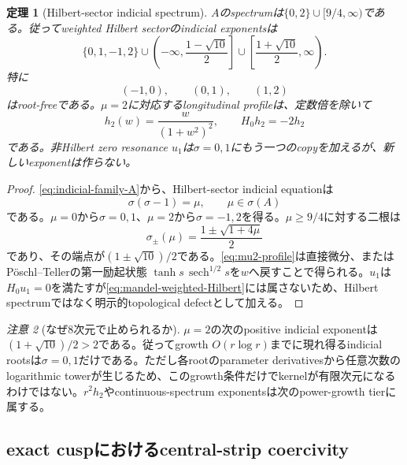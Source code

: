 \documentclass[11pt,a4paper]{ltjsarticle}
\newtheorem{theorem}{定理}[section]
\theoremstyle{definition}
\theoremstyle{remark}
\newtheorem{remark}[theorem]{注意}
\begin{document}
\begin{theorem}[Hilbert-sector indicial spectrum]\label{thm:indicial-spectrum}
$A$のspectrumは$\{0,2\}\cup[9/4,\infty)$である。従ってweighted Hilbert sectorのindicial exponentsは
\begin{equation}\label{eq:indicial-root-set}
 \{0,1,-1,2\}
 \cup
 \left(-\infty,\frac{1-\sqrt{10}}2\right]
 \cup
 \left[\frac{1+\sqrt{10}}2,\infty\right).
\end{equation}
特に
\begin{equation}\label{eq:root-free-strips}
 (-1,0),\qquad(0,1),\qquad(1,2)
\end{equation}
はroot-freeである。$\mu=2$に対応するlongitudinal profileは、定数倍を除いて
\begin{equation}\label{eq:mu2-profile}
 h_2(w)=\frac{w}{(1+w^2)^2},
 \qquad H_0h_2=-2h_2
\end{equation}
である。非Hilbert zero resonance $u_1$は$\sigma=0,1$にもう一つのcopyを加えるが、新しいexponentは作らない。
\end{theorem}

\begin{proof}
\eqref{eq:indicial-family-A}から、Hilbert-sector indicial equationは
\[
 \sigma(\sigma-1)=\mu,
 \qquad \mu\in\sigma(A)
\]
である。$\mu=0$から$\sigma=0,1$、$\mu=2$から$\sigma=-1,2$を得る。$\mu\ge9/4$に対する二根は
\[
 \sigma_\pm(\mu)=\frac{1\pm\sqrt{1+4\mu}}2
\]
であり、その端点が$(1\pm\sqrt{10})/2$である。\eqref{eq:mu2-profile}は直接微分、またはPöschl--Tellerの第一励起状態
$\tanh s\,\operatorname{sech}^{1/2}s$を$w$へ戻すことで得られる。$u_1$は$H_0u_1=0$を満たすが\eqref{eq:mandel-weighted-Hilbert}には属さないため、Hilbert spectrumではなく明示的topological defectとして加える。
\end{proof}

\begin{remark}[なぜ$8$次元で止められるか]
$\mu=2$の次のpositive indicial exponentは$(1+\sqrt{10})/2>2$である。従ってgrowth $O(r\log r)$までに現れ得るindicial rootsは$\sigma=0,1$だけである。ただし各rootのparameter derivativesから任意次数のlogarithmic towerが生じるため、このgrowth条件だけでkernelが有限次元になるわけではない。$r^2h_2$やcontinuous-spectrum exponentsは次のpower-growth tierに属する。
\end{remark}

\subsection{exact cuspにおけるcentral-strip coercivity}
\label{subsec:weighted-cusp-coercivity}
\end{document}
